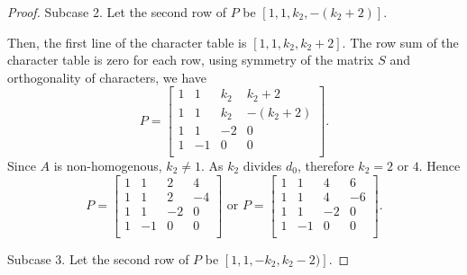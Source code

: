 \documentclass[12pt]{amsart}
\begin{document}
\begin{proof}
\medskip

Subcase 2. Let the second row of $P$ be $[1, 1,k_2,-(k_2+2)]$.

\smallskip

Then, the first line of the character table is $[1,1,k_2,k_2+2]$.
The row sum of the character table is zero for each row, using symmetry of the matrix $S$ and orthogonality of characters, we have
$$P=\left[
   \begin{array}{cccc}
     1 & 1 & k_2 &k_2+2\\
     1 & 1 &    k_2 &  -(k_2+2)\\
     1 & 1 &  -2&  0\\
     1 &-1 &  0&  0\\
   \end{array}
 \right].$$
Since $A$ is non-homogenous, $k_2\neq1$. As $k_2$ divides $d_0$, therefore $k_2=2$ or $4$. Hence
$$ P=\left[
   \begin{array}{cccc}
     1 & 1 & 2 &4\\
     1 &  1 &    2 &  -4\\
       1 &  1 &  -2&  0\\
         1 & -1 &  0& 0\\
   \end{array}\right]\mbox{ or } P=\left[
   \begin{array}{cccc}
     1 & 1 & 4 &6\\
     1 &  1 &   4 &  -6\\
       1 &  1 &  -2&  0\\
         1 & -1 &  0& 0\\
   \end{array}\right].$$

\medskip

Subcase 3. Let the second row of $P$ be $[1, 1,-k_2,k_2-2)]$.

\smallskip


\end{proof}
\end{document}
